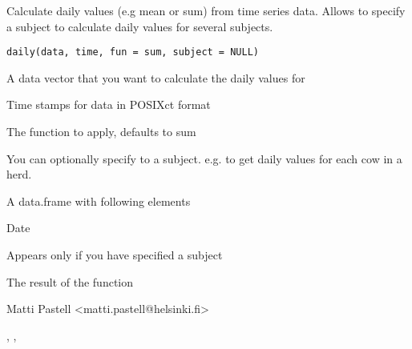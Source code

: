 \documentclass{book}
\begin{document}
\begin{Description}\relax
Calculate daily values (e.g mean or sum) from time series data. Allows
to specify a subject to calculate daily values for several subjects.
\end{Description}
\begin{Usage}
\begin{verbatim}
daily(data, time, fun = sum, subject = NULL)
\end{verbatim}
\end{Usage}
\begin{Arguments}
\begin{ldescription}
\item[\code{data}] A data vector that you want to calculate the daily values
for
\item[\code{time}] Time stamps for data in POSIXct format
\item[\code{fun}] The function to apply, defaults to sum
\item[\code{subject}] You can optionally specify to a subject. e.g. to get
daily values for each cow in a herd.
\end{ldescription}
\end{Arguments}
\begin{Value}
A data.frame with following elements
\begin{ldescription}
\item[\code{Day}] Date
\item[\code{Subject}] Appears only if you have specified a subject
\item[\code{Result}] The result of the function
\end{ldescription}
\end{Value}
\begin{Author}\relax
Matti Pastell <matti.pastell@helsinki.fi>
\end{Author}
\begin{SeeAlso}\relax
{}, ,
\end{SeeAlso}
\begin{Examples}
\end{Examples}
\end{document}
